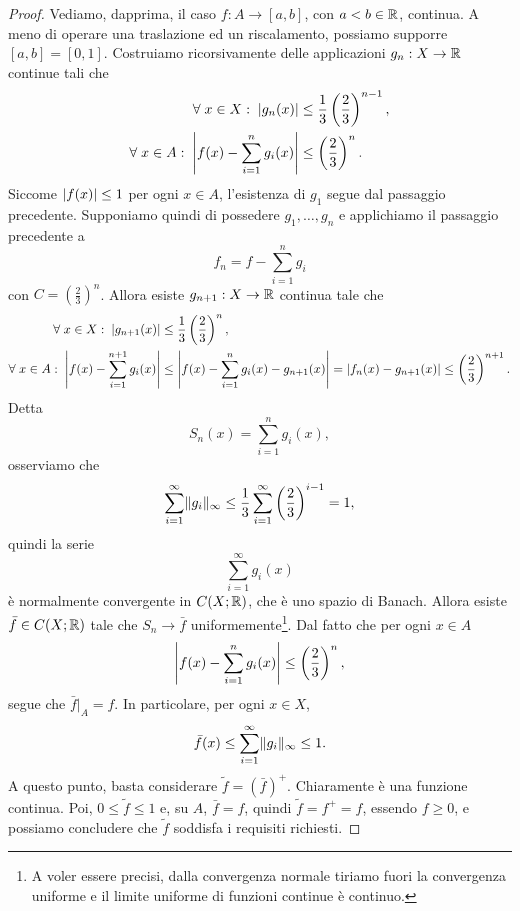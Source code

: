 \begin{proof}
	Vediamo, dapprima, il caso $f:A \to [a,b]$, con $a<b \in \R$, continua. A meno di operare una traslazione ed un riscalamento, possiamo supporre $[a,b] = [0,1]$. Costruiamo ricorsivamente delle applicazioni $g_n: X \to \R$ continue tali che 
	\begin{align*}
		\forall\; x \in X: \;\abs{g_n(x)} &\le \frac{1}{3}\left( \frac{2}{3}\right) ^{n-1},\\
		\forall \; x \in A: \; \abs*{f(x)- \sum_{i=1}^{n}g_i(x)} &\le \left( \frac{2}{3}\right)^{n}.
	\end{align*}
	Siccome $\abs{f(x)}\le 1$ per ogni $x \in A$, l'esistenza di $g_1$ segue dal passaggio precedente. Supponiamo quindi di possedere $g_1,\dots,g_{n}$ e applichiamo il passaggio precedente a  
	\[ f_n =f- \sum_{i=1}^n g_i\]
	con $C = \left( \frac{2}{3}\right)^{n}$. Allora esiste $g_{n+1}: X \to \R$ continua tale che
	\begin{align*}
		\forall\; x \in X: \;\abs{g_{n+1}(x)} &\le \frac{1}{3}\left( \frac{2}{3}\right) ^{n},\\
		\forall \; x \in A: \; \abs*{f(x)- \sum_{i=1}^{n+1}g_i(x)} &\le \abs*{f(x)- \sum_{i=1}^{n}g_i(x) - g_{n+1}(x)} = \abs*{f_n(x)- g_{n+1}(x)}\le  \left( \frac{2}{3}\right)^{n+1}.
	\end{align*}
	Detta 
	\[ S_n(x) = \sum_{i=1}^{n}g_i(x), \]
	osserviamo che 
	\[ \sum_{i=1}^{\infty}\norm{g_i}_\infty \le \frac{1}{3} \sum_{i=1}^{\infty}\left( \frac{2}{3}\right)^{i-1} = 1, \]
	quindi la serie 
	\[ \sum_{i=1}^{\infty}g_i(x) \]
	è normalmente convergente in $C(X;\R)$, che è uno spazio di Banach. Allora esiste $\bar{f} \in  C(X;\R)$ tale che $S_n \to \bar{f}$ uniformemente\footnote{A voler essere precisi, dalla convergenza normale tiriamo fuori la convergenza uniforme e il limite uniforme di funzioni continue è continuo.}. Dal fatto che per ogni $x \in A$
	\[ \abs*{f(x)- \sum_{i=1}^{n}g_i(x)} \le \left( \frac{2}{3}\right)^{n}, \]
	segue che $\bar{f}|_A = f$. In particolare, per ogni $x \in X$,
	\[\bar{f}(x) \le \sum_{i=1}^{\infty}\norm{g_i}_\infty \le 1. \]
	A questo punto, basta considerare $\tilde{f} = (\bar{f})^+$. Chiaramente è una funzione continua. Poi, $0\le \tilde{f} \le 1$ e, su $ A$, $\bar{f}=f$, quindi $\tilde{f} = f^+ = f$, essendo $f\ge 0$, e possiamo concludere che $\tilde{f}$ soddisfa i requisiti richiesti.
	

\end{proof}
